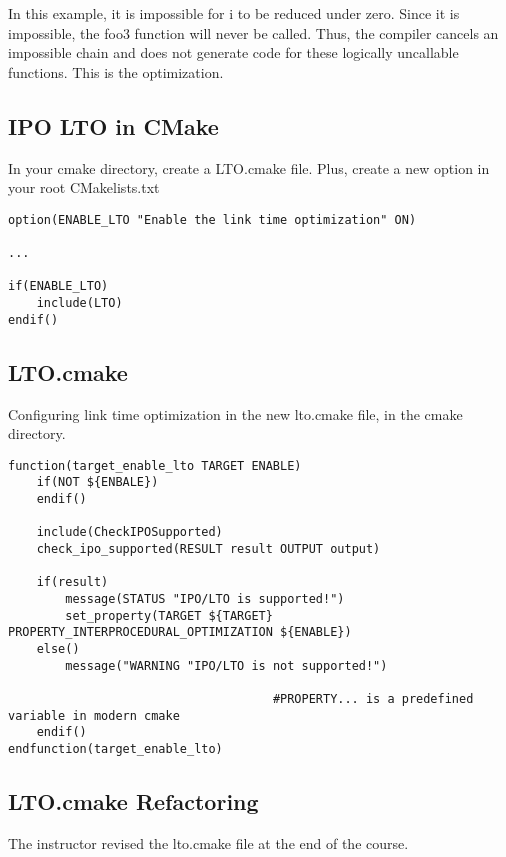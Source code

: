 In this example, it is impossible for i to be reduced under zero. Since it is impossible, the foo3 function will never be
called. Thus, the compiler cancels an impossible chain and does not generate code for these logically uncallable functions.
This is the optimization.

\subsection{IPO LTO in CMake}

In your cmake directory, create a LTO.cmake file. Plus, create a new option in your root CMakelists.txt


\begin{verbatim}
option(ENABLE_LTO "Enable the link time optimization" ON)

...

if(ENABLE_LTO)
    include(LTO)
endif()
\end{verbatim}


\subsection{LTO.cmake}

Configuring link time optimization in the new lto.cmake file, in the cmake directory.

\begin{verbatim}
function(target_enable_lto TARGET ENABLE)
    if(NOT ${ENBALE})
    endif()

    include(CheckIPOSupported)
    check_ipo_supported(RESULT result OUTPUT output)

    if(result) 
        message(STATUS "IPO/LTO is supported!")
        set_property(TARGET ${TARGET} PROPERTY_INTERPROCEDURAL_OPTIMIZATION ${ENABLE})
    else()
        message("WARNING "IPO/LTO is not supported!")

                                     #PROPERTY... is a predefined variable in modern cmake
    endif()
endfunction(target_enable_lto)
\end{verbatim}

\subsection{LTO.cmake Refactoring}

The instructor revised the lto.cmake file at the end of the course.

